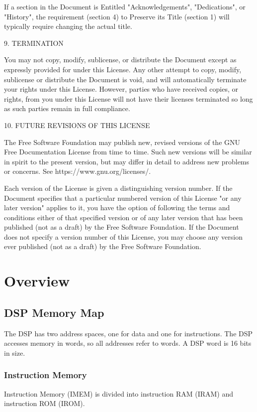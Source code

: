 \documentclass[oneside,english,a4paper,10pt,oneside,openany,final]{memoir}
\begin{document}
If a section in the Document is Entitled "Acknowledgements", "Dedications", or "History", the requirement (section 4) to Preserve its Title (section 1) will typically require changing the actual title.

9. TERMINATION

You may not copy, modify, sublicense, or distribute the Document except as expressly provided for under this License. Any other attempt to copy, modify, sublicense or distribute the Document is void, and will automatically terminate your rights under this License. However, parties who have received copies, or rights, from you under this License will not have their licenses terminated so long as such parties remain in full compliance.

10. FUTURE REVISIONS OF THIS LICENSE

The Free Software Foundation may publish new, revised versions of the GNU Free Documentation License from time to time. Such new versions will be similar in spirit to the present version, but may differ in detail to address new problems or concerns. See https://www.gnu.org/licenses/.

Each version of the License is given a distinguishing version number. If the Document specifies that a particular numbered version of this License "or any later version" applies to it, you have the option of following the terms and conditions either of that specified version or of any later version that has been published (not as a draft) by the Free Software Foundation. If the Document does not specify a version number of this License, you may choose any version ever published (not as a draft) by the Free Software Foundation. 

\pagebreak{}

\chapter{Overview}

\section{DSP Memory Map}

The DSP has two address spaces, one for data and one for instructions.  The DSP accesses memory in words, so all addresses refer to words. A DSP word is 16 bits in size.

\subsection{Instruction Memory}
Instruction Memory (IMEM) is divided into instruction RAM (IRAM) and instruction ROM (IROM).
\end{document}
